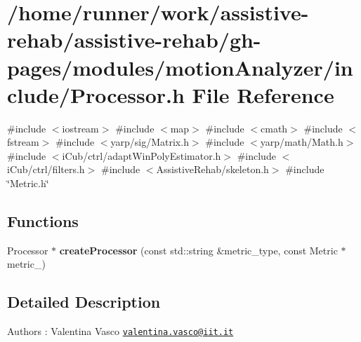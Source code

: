 \section{/home/runner/work/assistive-\/rehab/assistive-\/rehab/gh-\/pages/modules/motion\+Analyzer/include/\+Processor.h File Reference}
\label{Processor_8h}
{\ttfamily \#include $<$iostream$>$}\newline
{\ttfamily \#include $<$map$>$}\newline
{\ttfamily \#include $<$cmath$>$}\newline
{\ttfamily \#include $<$fstream$>$}\newline
{\ttfamily \#include $<$yarp/sig/\+Matrix.\+h$>$}\newline
{\ttfamily \#include $<$yarp/math/\+Math.\+h$>$}\newline
{\ttfamily \#include $<$i\+Cub/ctrl/adapt\+Win\+Poly\+Estimator.\+h$>$}\newline
{\ttfamily \#include $<$i\+Cub/ctrl/filters.\+h$>$}\newline
{\ttfamily \#include $<$Assistive\+Rehab/skeleton.\+h$>$}\newline
{\ttfamily \#include \char`\"{}Metric.\+h\char`\"{}}\newline
\subsection*{Functions}
\begin{DoxyCompactItemize}
\item 
\mbox{\label{Processor_8h_a0ae4c67160d19584fcd102d4616a5bee}} 
Processor $\ast$ {\bfseries create\+Processor} (const std\+::string \&metric\+\_\+type, const Metric $\ast$metric\+\_\+)
\end{DoxyCompactItemize}


\subsection{Detailed Description}
\begin{DoxyAuthor}{Authors}
\+: Valentina Vasco \href{mailto:valentina.vasco@iit.it}{\tt valentina.\+vasco@iit.\+it} 
\end{DoxyAuthor}
